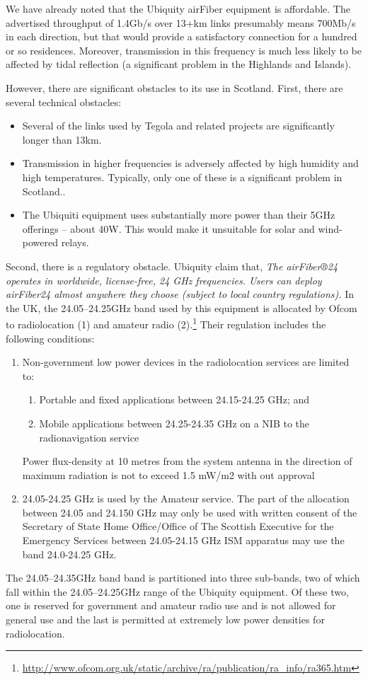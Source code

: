 \documentclass{amsart}
\begin{document}
We have
already noted that the Ubiquity airFiber equipment is affordable. The advertised
throughput of 1.4Gb/s over 13+km links presumably means 700Mb/s in each direction, but
that would provide a satisfactory connection for a hundred or
so residences. Moreover, transmission in this frequency is much
less likely to be affected by tidal reflection (a significant problem
in the Highlands and Islands).

However, there are significant obstacles to its use in
Scotland. First, there are several technical obstacles:
\begin{itemize}
\item
  Several of the links used by Tegola and related projects are
  significantly longer 
  than 13km.
\item
  Transmission in higher frequencies is adversely affected by high 
  humidity and high temperatures. Typically, only one of 
  these is a significant problem in Scotland..
\item
  The Ubiquiti equipment uses substantially more power than their 5GHz 
  offerings -- about 40W. This would make it unsuitable for solar and 
  wind-powered relays.
\end{itemize}

Second, there is a regulatory obstacle.
Ubiquity claim that, \emph{The airFiber®24 operates in worldwide,
  license-free, 24 GHz frequencies. Users can deploy airFiber24 almost
  anywhere they choose (subject to local country regulations).}
  In the UK, the 24.05--24.25GHz band used by this equipment is
  allocated by Ofcom to radiolocation (1) and amateur radio
  (2).\footnote{\url{http://www.ofcom.org.uk/static/archive/ra/publication/ra_info/ra365.htm}} Their
  regulation includes the following conditions:
\begin{enumerate}
\item Non-government low power devices in the radiolocation services
  are limited to:
\begin{enumerate}
\item Portable and fixed applications between 24.15-24.25 GHz; and
\item Mobile applications between 24.25-24.35 GHz on a NIB to the radionavigation service
\end{enumerate}
Power flux-density at 10 metres from the system antenna in the
direction of maximum radiation is not to exceed 1.5 mW/m2 with out
approval
\item 24.05-24.25 GHz is used by the Amateur service. The part of the allocation between 24.05 and 24.150 GHz may only be used with written consent of the Secretary of State
Home Office/Office of The Scottish Executive for the Emergency Services between 24.05-24.15 GHz
ISM apparatus may use the band 24.0-24.25 GHz.
\end{enumerate}
The 24.05--24.35GHz band band is partitioned into three
  sub-bands, two of which fall within the 24.05--24.25GHz range of the
  Ubiquity equipment. Of these two, one
  is reserved for government and amateur radio use and is not allowed
  for general use and the last is permitted at extremely low power
  densities for radiolocation.  
\end{document}
